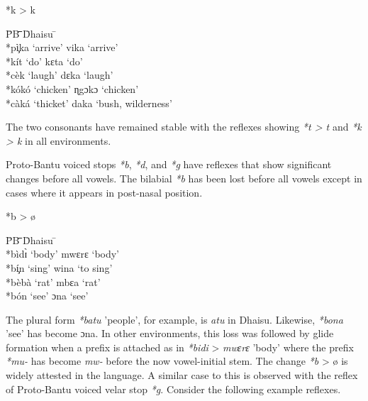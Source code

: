\documentclass[output=paper,colorlinks,citecolor=brown]{langscibook}
\begin{document}
\ea%
    \label{ex:ngonyani:5}
    *k > k\\
    \begin{tabbing} 
        \= PB \quad\= \quad\= \quad\= \quad\= \quad\= \quad\= \quad\= Dhaisu \quad\=  \quad\= \\
        \> *pì̧ka \> ‘arrive’ \> \> \>  \> \> \> vika \> ‘arrive’\\
        \> *kít \> ‘do’ \> \> \>  \> \> \> kɛta \> ‘do’\\
        \> *cèk \> ‘laugh’ \> \> \>  \> \> \> dɛka \> ‘laugh’\\
        \> *kókó \> ‘chicken’ \> \> \>  \> \> \> ɳgɔkɔ \> ‘chicken’\\
        \> *càká \> ‘thicket’\> \> \>  \> \> \> daka \> ‘bush, wilderness’
    \end{tabbing}
\z

The two consonants have remained stable with the reflexes showing \textit{*t > t }and \textit{*k > k } in  all  environments.

Proto-Bantu voiced stops \textit{*b}, \textit{*d}, and \textit{*g} have reflexes that show significant changes before all vowels. The bilabial \textit{*b} has been lost before all vowels except in cases where it appears in post-nasal position.

\ea%
    \label{ex:ngonyani:6}
    *b > ø\\
    \begin{tabbing} 
        \= PB \quad\= \quad\= \quad\= \quad\= \quad\= \quad\= \quad\= Dhaisu \quad\=  \quad\= \\
        \> *bìdɪ̀
        \> ‘body’
        \> \> \>  \> \> \> mwɛrɛ
        \> ‘body’\\
        \> *bí̧n
        \> ‘sing’
        \> \> \>  \> \> \> wina
        \> ‘to sing’\\
        \> *bèbà
        \> ‘rat’
        \> \> \>  \> \> \> mbɛa
        \> ‘rat’\\
        \> *bón
        \> ‘see’
        \> \> \>  \> \> \>  ɔna
        \> ‘see’
    \end{tabbing}
\z

The plural form \textit{*batu}  'people', for example, is \textit{atu} in Dhaisu. Likewise, \textit{*bona} 'see' has become ɔna. In other environments, this loss was followed by glide formation when a prefix is attached as in \textit{*bidi} > \textit{mwɛrɛ} 'body' where the prefix  \textit{*mu-} has become \textit{mw-} before the now vowel-initial stem. The change \textit{*b} > ø is widely attested in the language. A similar case to this is observed with the reflex of Proto-Bantu voiced velar stop \textit{*g}. Consider the following example reflexes. 
\end{document}
